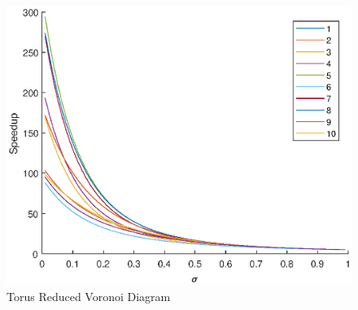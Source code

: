 \begin{figure}[!ht]
\centering
\includegraphics[width=1\columnwidth]{figure/t_voronoi_speedup_save.eps}
\caption{Torus Reduced Voronoi Diagram}
\label{fig:t_voronoi_speedup_save}
\end{figure}

